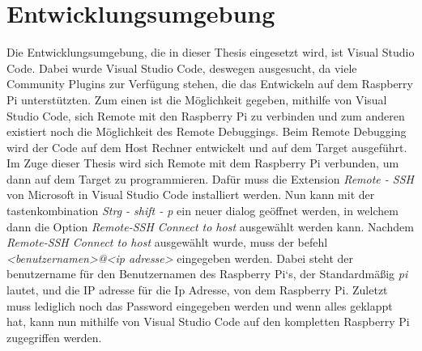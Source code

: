 \section{Entwicklungsumgebung}
\label{sec:entwicklungsumgebung}
Die Entwicklungsumgebung, die in dieser Thesis eingesetzt wird, ist Visual Studio Code. Dabei
wurde Visual Studio Code, deswegen ausgesucht, da viele Community Plugins zur Verfügung stehen,
die das Entwickeln auf dem Raspberry Pi unterstützten. Zum einen ist die Möglichkeit gegeben,
mithilfe von Visual Studio Code, sich Remote mit den Raspberry Pi zu verbinden und zum anderen
existiert noch die Möglichkeit des Remote Debuggings. Beim Remote Debugging wird der Code auf dem
Host Rechner entwickelt und auf dem Target ausgeführt.
\newline
\newline
Im Zuge dieser Thesis wird sich Remote mit dem Raspberry Pi verbunden, um dann auf dem Target zu
programmieren. Dafür muss die Extension \emph{Remote - SSH} von Microsoft in Visual Studio Code
installiert werden. Nun kann mit der tastenkombination \emph{Strg - shift - p} ein neuer dialog
geöffnet werden, in welchem dann die Option \emph{Remote-SSH Connect to host} ausgewählt werden
kann. Nachdem \emph{Remote-SSH Connect to host} ausgewählt wurde, muss der befehl
\emph{<benutzernamen>@<ip adresse>} eingegeben werden. Dabei steht der benutzername für den
Benutzernamen des Raspberry Pi`s, der Standardmäßig \emph{pi} lautet, und die IP adresse für die Ip
Adresse, von dem Raspberry Pi. Zuletzt muss lediglich noch das Password eingegeben werden und
wenn alles geklappt hat, kann nun mithilfe von Visual Studio Code auf den kompletten Raspberry Pi
zugegriffen werden.